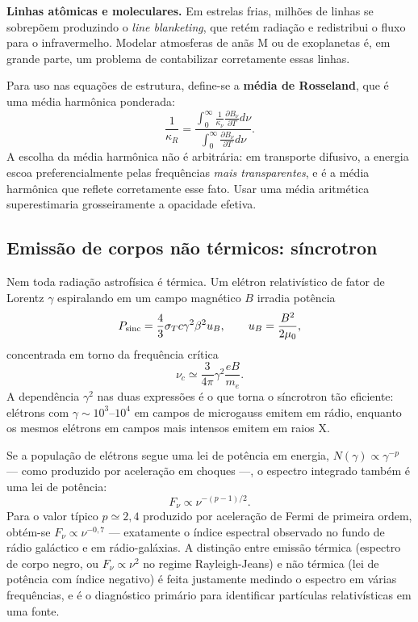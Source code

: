 \documentclass[11pt,a4paper]{article}
\begin{document}
\textbf{Linhas atômicas e moleculares.} Em estrelas frias, milhões de linhas se sobrepõem produzindo o \textit{line blanketing}, que retém radiação e redistribui o fluxo para o infravermelho. Modelar atmosferas de anãs M ou de exoplanetas é, em grande parte, um problema de contabilizar corretamente essas linhas.

Para uso nas equações de estrutura, define-se a \textbf{média de Rosseland}, que é uma média harmônica ponderada:
\[
\frac{1}{\kappa_R}=\frac{\int_0^{\infty}\frac{1}{\kappa_\nu}\frac{\partial B_\nu}{\partial T}d\nu}{\int_0^{\infty}\frac{\partial B_\nu}{\partial T}d\nu}.
\]
A escolha da média harmônica não é arbitrária: em transporte difusivo, a energia escoa preferencialmente pelas frequências \emph{mais transparentes}, e é a média harmônica que reflete corretamente esse fato. Usar uma média aritmética superestimaria grosseiramente a opacidade efetiva.

\subsection*{Emissão de corpos não térmicos: síncrotron}

Nem toda radiação astrofísica é térmica. Um elétron relativístico de fator de Lorentz $\gamma$ espiralando em um campo magnético $B$ irradia potência
\[
P_{\rm sinc}=\frac{4}{3}\sigma_Tc\gamma^{2}\beta^{2}u_B,
\qquad
u_B=\frac{B^{2}}{2\mu_0},
\]
concentrada em torno da frequência crítica
\[
\nu_c\simeq\frac{3}{4\pi}\gamma^{2}\frac{eB}{m_e}.
\]
A dependência $\gamma^{2}$ nas duas expressões é o que torna o síncrotron tão eficiente: elétrons com $\gamma\sim10^{3}$--$10^{4}$ em campos de microgauss emitem em rádio, enquanto os mesmos elétrons em campos mais intensos emitem em raios X.

Se a população de elétrons segue uma lei de potência em energia, $N(\gamma)\propto\gamma^{-p}$ --- como produzido por aceleração em choques ---, o espectro integrado também é uma lei de potência:
\[
F_\nu\propto\nu^{-(p-1)/2}.
\]
Para o valor típico $p\simeq2{,}4$ produzido por aceleração de Fermi de primeira ordem, obtém-se $F_\nu\propto\nu^{-0{,}7}$ --- exatamente o índice espectral observado no fundo de rádio galáctico e em rádio-galáxias. A distinção entre emissão térmica (espectro de corpo negro, ou $F_\nu\propto\nu^{2}$ no regime Rayleigh-Jeans) e não térmica (lei de potência com índice negativo) é feita justamente medindo o espectro em várias frequências, e é o diagnóstico primário para identificar partículas relativísticas em uma fonte.
\end{document}
